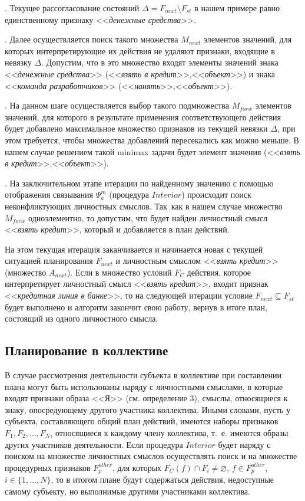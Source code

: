 \documentclass[a4paper, 12pt]{article}
\numberwithin{equation}{section}
\begin{document}
	. Текущее рассогласование состояний $\Delta=F_{next}\setminus F_{st}$ в нашем примере равно единственному признаку <<\textit{денежные средства}>>.
	
	. Далее осуществляется поиск такого множества $M_{next}$ элементов значений, для которых интерпретирующие их действия не удаляют признаки, входящие в невязку $\Delta$. Допустим, что в это множество входят элементы значений знака <<\textit{денежные средства}>> (<<\textit{взять в кредит}>>,<<\textit{объект}>>) и знака <<\textit{команда разработчиков}>> (<<\textit{нанять}>>,<<\textit{объект}>>).
	
	. На данном шаге осуществляется выбор такого подмножества $M_{forw}$ элементов значений, для которого в результате применения соответствующего действия будет добавлено максимальное множество признаков из текущей невязки $\Delta$, при этом требуется, чтобы множества добавлений пересекались как можно меньше. В нашем случае решением такой minimax задачи будет элемент значения (<<\textit{взять в кредит}>>,<<\textit{объект}>>).
	
	. На заключительном этапе итерации по найденному значению с помощью отображения связывания $\Psi_a^m$ (процедура $Interior$) происходит поиск неконфликтующих личностных смыслов. Так~как в нашем случае множество $M_{forw}$ одноэлементно, то допустим, что будет найден личностный смысл <<\textit{взять кредит}>>, который и добавляется в план действий.
	
	На этом текущая итерация заканчивается и начинается новая с текущей ситуацией планирования $F_{next}$ и личностным смыслом <<\textit{взять кредит}>> (множество $A_{next}$). Если в множество условий $F_C$ действия, которое интерпретирует личностный смысл <<\textit{взять кредит}>>, входит признак <<\textit{кредитная линия в банке}>>, то на следующей итерации условие $F_{next}\subseteq F_{st}$ будет выполнено и алгоритм закончит свою работу, вернув в итоге план, состоящий из одного личностного смысла.
	
	\subsection{Планирование в коллективе} В случае рассмотрения деятельности субъекта в коллективе при составлении плана могут быть использованы наряду с личностными смыслами, в которые входят признаки образа <<Я>> (см. определение 3), смыслы, относящиеся к знаку, опосредующему другого участника коллектива. Иными словами, пусть у субъекта, составляющего общий план действий, имеются наборы признаков $F_1,F_2,\dots,F_N$, относящиеся к каждому члену коллектива, т.~е. имеются образы других участников деятельности. Если процедура $Interior$ будет наряду с поиском на множестве личностных смыслов осуществлять поиск и на множестве процедурных признаков $F_p^{other}$, для которых $F_C(f)\cap F_i\not = \varnothing$, $f\in F_p^{other}$, $i\in\{1,\dots,N\}$, то в итогом плане будут содержаться действия, недоступные самому субъекту, но выполнимые другими участниками коллектива.
	
\end{document}
